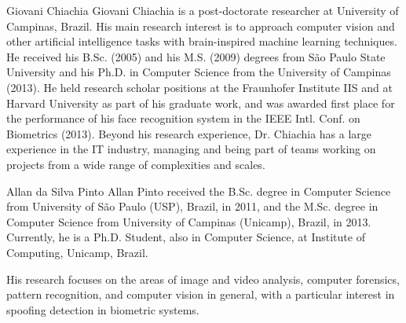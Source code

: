\documentclass[journal]{IEEEtran}
\begin{document}
\begin{IEEEbiography}{Giovani Chiachia}  
Giovani Chiachia is a post-doctorate researcher at University of Campinas, Brazil.
His main research interest is to approach computer vision and other artificial intelligence tasks with brain-inspired machine learning techniques. 
He received his B.Sc. (2005) and his M.S. (2009) degrees from São Paulo State University and his Ph.D. in Computer Science from the University of Campinas (2013).
He held research scholar positions at the Fraunhofer Institute IIS and at Harvard University as part of his graduate work, and was awarded first place for the performance of his face recognition system in the IEEE Intl. Conf. on Biometrics (2013). 
Beyond his research experience, Dr. Chiachia has a large experience in the IT industry, managing and being part of teams working on projects from a wide range of complexities and scales.
\end{IEEEbiography}

\begin{IEEEbiography}{Allan da Silva Pinto} 
Allan Pinto received the B.Sc. degree in Computer Science from University of São Paulo (USP), Brazil, in 2011, and the M.Sc. degree in Computer Science from University of Campinas (Unicamp), Brazil, in 2013. Currently, he is a Ph.D. Student, also in Computer Science, at Institute of Computing, Unicamp, Brazil. 

His research focuses on the areas of image and video analysis, computer forensics, pattern recognition, and computer vision in general, with a particular interest in spoofing detection in biometric systems.
\end{IEEEbiography}
\end{document}
